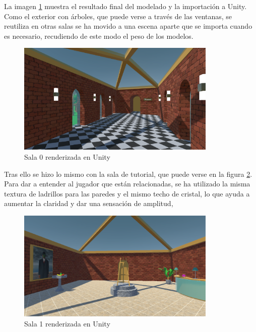 La imagen \ref{fig:unity-sala-0} muestra el resultado final del modelado y la importación a Unity. Como el exterior con árboles, que puede verse a través de las ventanas, se reutiliza en otras salas se ha movido a una escena aparte que se importa cuando es necesario, recudiendo de este modo el peso de los modelos.

\begin{figure}[!h]
\begin{center}
\includegraphics[width=0.85\textwidth]{imagenes/7/salas-unity/unity-sala-0.png}
\caption{Sala 0 renderizada en Unity}
\label{fig:unity-sala-0}
\end{center}
\end{figure}

Tras ello se hizo lo mismo con la sala de tutorial, que puede verse en la figura \ref{fig:unity-sala-1}. Para dar a entender al jugador que están relacionadas, se ha utilizado la misma textura de ladrillos para las paredes y el mismo techo de cristal, lo que ayuda a aumentar la claridad y dar una sensación de amplitud,

\begin{figure}[!h]
\begin{center}
\includegraphics[width=0.85\textwidth]{imagenes/7/salas-unity/unity-sala-1.png}
\caption{Sala 1 renderizada en Unity}
\label{fig:unity-sala-1}
\end{center}
\end{figure}

